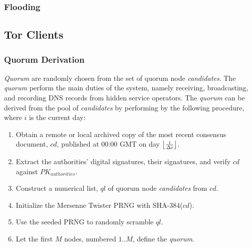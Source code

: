 

\subsubsection{Flooding}


\subsection{Tor Clients}
\label{sec:ProtoTorClients}

\subsubsection{Quorum Derivation}

\emph{Quorum} are randomly chosen from the set of quorum node \emph{candidates}. The \emph{quorum} perform the main duties of the system, namely receiving, broadcasting, and recording DNS records from hidden service operators. The \emph{quorum} can be derived from the pool of \emph{candidates} by performing by the following procedure, where $ i $ is the current day:

\begin{enumerate}
	\item Obtain a remote or local archived copy of the most recent consensus document, $ cd $, published at 00:00 GMT on day $ \floor[\big]{\frac{i}{\Delta i}} $.
	\item Extract the authorities' digital signatures, their signatures, and verify $ cd $ against $ PK_{authorities} $.
	\item Construct a numerical list, $ ql $ of quorum node \emph{candidates} from $ cd $.
	\item Initialize the Mersenne Twister PRNG with SHA-384($ cd $).
	\item Use the seeded PRNG to randomly scramble $ ql $.
	\item Let the first $ M $ nodes, numbered $ 1 .. M $, define the \emph{quorum}.
\end{enumerate}

